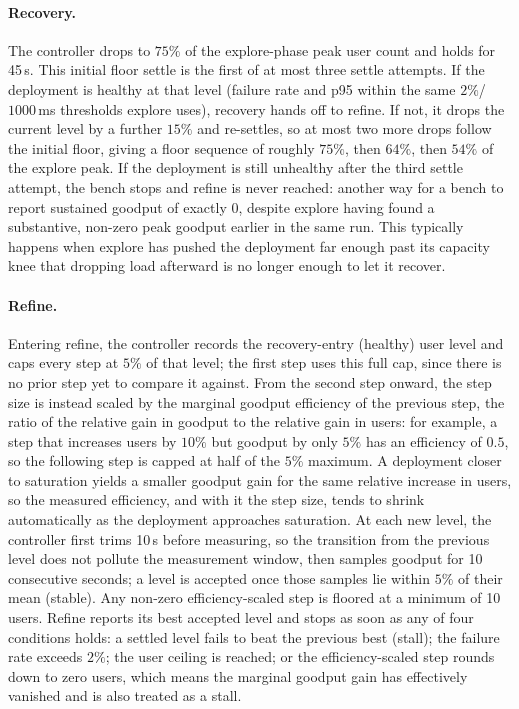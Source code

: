 \paragraph{Recovery.}
The controller drops to $75\%$ of the explore-phase peak user count and
holds for 45\,s. This initial floor settle is the first of at most three
settle attempts. If the deployment is healthy at that level (failure rate
and p95 within the same $2\%$/$1000$\,ms thresholds explore uses),
recovery hands off to refine. If not, it drops the current level by a
further $15\%$ and re-settles, so at most two more drops follow the
initial floor, giving a floor sequence of roughly $75\%$, then $64\%$,
then $54\%$ of the explore peak. If the deployment is still unhealthy
after the third settle attempt, the bench stops and refine is never
reached: another way for a bench to report sustained goodput
of exactly $0$, despite explore having found a substantive, non-zero
peak goodput earlier in the same run. This typically happens when
explore has pushed the deployment far enough past its capacity knee that
dropping load afterward is no longer enough to let it recover.

\paragraph{Refine.}
Entering refine, the controller records the recovery-entry (healthy)
user level and caps every step at $5\%$ of that level; the first step
uses this full cap, since there is no prior step yet to compare it
against. From the second step onward, the step size is instead scaled by
the marginal goodput efficiency of the previous step, the ratio of the
relative gain in goodput to the relative gain in users: for example, a
step that increases users by $10\%$ but goodput by only $5\%$ has an
efficiency of $0.5$, so the following step is capped at half of the
$5\%$ maximum. A deployment closer to saturation yields a smaller
goodput gain for the same relative increase in users, so the measured
efficiency, and with it the step size, tends to shrink automatically as
the deployment approaches saturation. At each new level, the controller
first trims
10\,s before measuring, so the transition from the previous level does
not pollute the measurement window, then samples goodput for 10
consecutive seconds; a level is accepted once those samples lie within
$5\%$ of their mean (stable). Any non-zero efficiency-scaled step is
floored at a minimum of 10 users. Refine reports its best accepted level
and stops as soon as any of four conditions holds: a settled level fails
to beat the previous best (stall); the failure rate exceeds $2\%$; the
user ceiling is reached; or the efficiency-scaled step rounds down to zero
users, which means the marginal goodput gain has effectively vanished and
is also treated as a stall.

